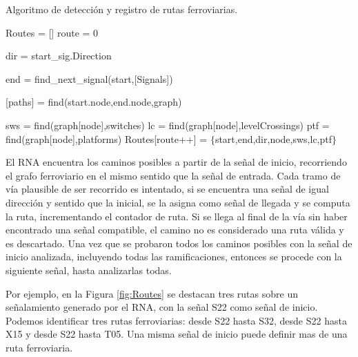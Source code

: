 	\begin{algorithm}[hbt!]
        \caption{Algoritmo de detección y registro de rutas ferroviarias.}\label{alg:routes}
        \DontPrintSemicolon
        \SetNoFillComment
        \LinesNotNumbered 
        Routes = []\; 
        route = 0\;
        {
            {
                dir = start\_sig.Direction\;
                
                end = find\_next\_signal(start,[Signals])\;

                [paths] = find(start.node,end.node,graph)\;
                
                {
                    sws = find(graph[node],switches)\;
                    lc = find(graph[node],levelCrossings)\;
                    ptf = find(graph[node],platforms)\;
                    Routes[route++] = $\{$start,end,dir,node,sws,lc,ptf$\}$\;
                }
            }
        }
        \KwResult{[Routes]} 
    \end{algorithm}
        
    El RNA encuentra los caminos posibles a partir de la señal de inicio, recorriendo el grafo ferroviario en el mismo sentido que la señal de entrada. Cada tramo de vía plausible de ser recorrido es intentado, si se encuentra una señal de igual dirección y sentido que la inicial, se la asigna como señal de llegada y se computa la ruta, incrementando el contador de ruta. Si se llega al final de la vía sin haber encontrado una señal compatible, el camino no es considerado una ruta válida y es descartado. Una vez que se probaron todos los caminos posibles con la señal de inicio analizada, incluyendo todas las ramificaciones, entonces se procede con la siguiente señal, hasta analizarlas todas.
    
    Por ejemplo, en la Figura \ref{fig:Routes} se destacan tres rutas sobre un señalamiento generado por el RNA, con la señal S22 como señal de inicio. Podemos identificar tres rutas ferroviarias: desde S22 hasta S32, desde S22 hasta X15 y desde S22 hasta T05. Una misma señal de inicio puede definir mas de una ruta ferroviaria.
    
